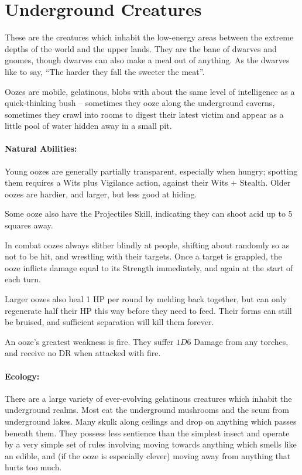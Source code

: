 \section[Underground Creatures]{Underground Creatures \A}

\begin{multicols}{2}

\noindent
These are the creatures which inhabit the low-energy areas between the extreme depths of the world and the upper lands.
They are the bane of dwarves and gnomes, though dwarves can also make a meal out of anything.
As the dwarves like  to say, ``The harder they fall the sweeter the meat''.

\label{ooze}

Oozes are mobile, gelatinous, blobs with about the same level of intelligence as a quick-thinking bush -- sometimes they ooze along the underground caverns, sometimes they crawl into rooms to digest their latest victim and appear as a little pool of water hidden away in a small pit.

\paragraph{Natural Abilities:} Young oozes are generally partially transparent, especially when hungry; spotting them requires a Wits plus Vigilance action, against their Wits + Stealth.
Older oozes are hardier, and larger, but less good at hiding.

Some ooze also have the Projectiles Skill, indicating they can shoot acid up to 5 squares away.

In combat oozes always slither blindly at people, shifting about randomly so as not to be hit, and wrestling with their targets.
Once a target is grappled, the ooze inflicts damage equal to its Strength immediately, and again at the start of each turn.

Larger oozes also heal 1 HP per round by melding back together, but can only regenerate half their HP this way before they need to feed.
Their forms can still be bruised, and sufficient separation will kill them forever.

An ooze's greatest weakness is fire.
They suffer $1D6$ Damage from any torches, and receive no DR when attacked with fire.

\paragraph{Ecology:} There are a large variety of ever-evolving gelatinous creatures which inhabit the underground realms.
Most eat the underground mushrooms and the scum from underground lakes.
Many skulk along ceilings and drop on anything which passes beneath them.
They possess less sentience than the simplest insect and operate by a very simple set of rules involving moving towards anything which smells like an edible, and (if the ooze is especially clever) moving away from anything that hurts too much.


\end{multicols}
